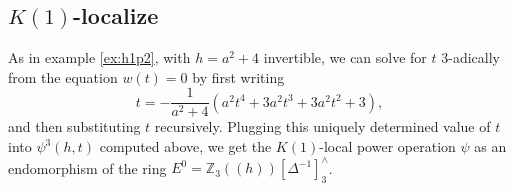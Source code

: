 \documentclass{gtpart}
\theoremstyle{definition}
\theoremstyle{remark}
\newcommand{\mb}[1]{\mathbb{#1}}
\begin{document}
\subsection{$K(1)$-localize}
\label{subsec:step3}

As in example \ref{ex:h1p2}, with $h = a^2 + 4$ invertible, we can 
solve for $t$ 3-adically from the equation $w(t) = 0$ by first writing 
\[
 t = -\frac{1}{a^2 + 4}(a^2 t^4 + 3 a^2 t^3 + 3 a^2 t^2 + 3),
\]
and then substituting $t$ recursively.  Plugging this uniquely determined 
value of $t$ into $\psi^3(h,t)$ computed above, 
we get the $K(1)$-local power operation $\psi$ as an endomorphism of the 
ring $E^0 = {\mb Z}_3 (\!(h)\!) [\Delta^{-1}]_3^\wedge$.  


\nocite{*}

\end{document}
